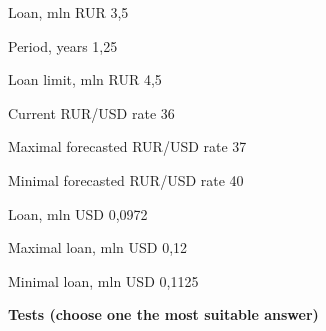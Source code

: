 \documentclass[12pt, table]{exam}
\begin{document}
\begin{questions}
\begin{solution}[8em]
	
	Loan, mln RUR	3,5
	
	Period, years	1,25
	
	Loan limit, mln RUR	4,5
	
	Current RUR/USD rate	36
	
	Maximal forecasted RUR/USD rate	37
	
	Minimal forecasted RUR/USD rate	40
	
	Loan, mln USD	0,0972
	
	Maximal loan, mln USD	0,12
	
	Minimal loan, mln USD	0,1125
	
\end{solution}
\end{questions}


\pagebreak
\noindent\textbf{Tests (choose one the most suitable answer)}
\end{document}
